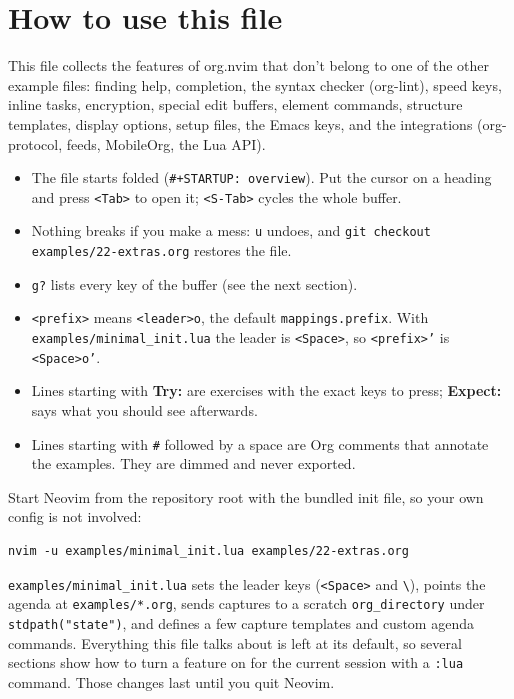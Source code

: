 \section{How to use this file}
\label{sec:org8463113}
This file collects the features of org.nvim that don't belong to one of the
other example files: finding help, completion, the syntax checker
(org-lint), speed keys, inline tasks, encryption, special edit buffers,
element commands, structure templates, display options, setup files, the
Emacs keys, and the integrations (org-protocol, feeds, MobileOrg, the Lua
API).

\begin{itemize}
\item The file starts folded (\texttt{\#+STARTUP: overview}). Put the cursor on a
heading and press \texttt{<Tab>} to open it; \texttt{<S-Tab>} cycles the whole buffer.
\item Nothing breaks if you make a mess: \texttt{u} undoes, and
\texttt{git checkout examples/22-extras.org} restores the file.
\item \texttt{g?} lists every key of the buffer (see the next section).
\item \texttt{<prefix>} means \texttt{<leader>o}, the default \texttt{mappings.prefix}. With
\texttt{examples/minimal\_init.lua} the leader is \texttt{<Space>}, so \texttt{<prefix>'} is
\texttt{<Space>o'}.
\item Lines starting with \textbf{Try:} are exercises with the exact keys to press;
\textbf{Expect:} says what you should see afterwards.
\item Lines starting with \texttt{\#} followed by a space are Org comments that annotate
the examples. They are dimmed and never exported.
\end{itemize}

Start Neovim from the repository root with the bundled init file, so your
own config is not involved:

\begin{verbatim}
nvim -u examples/minimal_init.lua examples/22-extras.org
\end{verbatim}

\texttt{examples/minimal\_init.lua} sets the leader keys (\texttt{<Space>} and \texttt{\textbackslash{}}),
points the agenda at \texttt{examples/*.org}, sends captures to a scratch
\texttt{org\_directory} under \texttt{stdpath("state")}, and defines a few capture
templates and custom agenda commands. Everything this file talks about is
left at its default, so several sections show how to turn a feature on
for the current session with a \texttt{:lua} command. Those changes last until
you quit Neovim.
